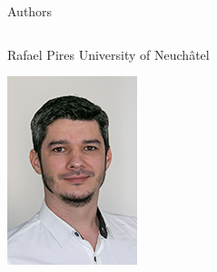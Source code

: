 \documentclass[presentation]{beamer}
\begin{document}
\begin{frame}[label={sec:orgadbd897}]{Authors}
\begin{block}{}
\begin{columns}
\begin{column}{0.2\columnwidth}
\begin{block}{Rafael Pires}
University of Neuchâtel\\
\begin{center}
\includegraphics[width=.9\linewidth]{./IMGs/rafael.jpg}
\end{center}
\end{block}
\end{column}


\end{columns}
\end{block}
\end{frame}
\end{document}
